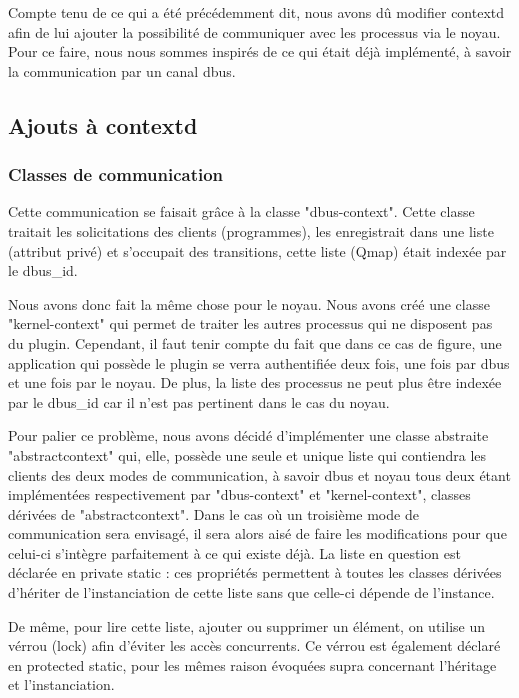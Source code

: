 \documentclass[pdftex,a4paper,titlepage,11pt]{article}
\begin{document}
Compte tenu de ce qui a été précédemment dit, nous avons dû modifier contextd afin de lui ajouter la possibilité de communiquer avec les processus via le noyau. Pour ce faire, nous nous sommes inspirés de ce qui était déjà implémenté, à savoir la communication par un canal dbus.

\subsection{Ajouts à contextd}

\subsubsection{Classes de communication}

Cette communication se faisait grâce à la classe "dbus-context". Cette classe traitait les solicitations des clients (programmes), les enregistrait dans une liste (attribut privé) et s'occupait des transitions, cette liste (Qmap) était indexée par le dbus\_id.

Nous avons donc fait la même chose pour le noyau. Nous avons créé une classe "kernel-context" qui permet de traiter les autres processus qui ne disposent pas du plugin. Cependant, il faut tenir compte du fait que dans ce cas de figure, une application qui possède le plugin se verra authentifiée deux fois, une fois par dbus et une fois par le noyau. De plus, la liste des processus ne peut plus être indexée par le dbus\_id car il n'est pas pertinent dans le cas du noyau.

Pour palier ce problème, nous avons décidé d'implémenter une classe abstraite "abstractcontext" qui, elle, possède une seule et unique liste qui contiendra les clients des deux modes de communication, à savoir dbus et noyau tous deux étant implémentées respectivement par "dbus-context" et "kernel-context", classes dérivées de "abstractcontext". Dans le cas où un troisième mode de communication sera envisagé, il sera alors aisé de faire les modifications pour que celui-ci s'intègre parfaitement à ce qui existe déjà. La liste en question est déclarée en private static : ces propriétés permettent à toutes les classes dérivées d'hériter de l'instanciation de cette liste sans que celle-ci dépende de l'instance.

De même, pour lire cette liste, ajouter ou supprimer un élément, on utilise un vérrou (lock) afin d'éviter les accès concurrents. Ce vérrou est également déclaré en protected static, pour les mêmes raison évoquées supra concernant l'héritage et l'instanciation.
\end{document}
